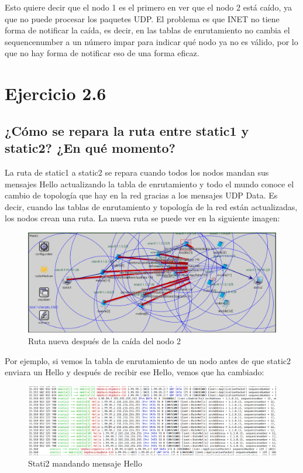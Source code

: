 Esto quiere decir que el nodo 1 es el primero en ver que el nodo 2 está caído, ya que no puede procesar los paquetes UDP. El problema es que INET no tiene forma de notificar la caída, es decir, en las tablas de enrutamiento no cambia el sequencenumber a un número impar para indicar qué nodo ya no es válido, por lo que no hay forma de notificar eso de una forma eficaz.



\section{Ejercicio 2.6}

\subsection{¿Cómo se repara la ruta entre static1 y static2? ¿En qué momento?}

La ruta de static1 a static2 se repara cuando todos los nodos mandan sus mensajes Hello actualizando la tabla de enrutamiento y todo el mundo conoce el cambio de topología que hay en la red gracias a los mensajes UDP Data. Es decir, cuando las tablas de enrutamiento y topología de la red están actualizadas, los nodos crean una ruta. La nueva ruta se puede ver en la siguiente imagen:

\begin{figure}[H]
    \centering
    \includegraphics[width=115mm, scale=0.75]{imaxes/dsdv/ejercicio2_6.png}
    \caption{Ruta nueva después de la caída del nodo 2}
    \label{fig:ejer2_6}
\end{figure}

Por ejemplo, si vemos la tabla de enrutamiento de un nodo antes de que static2 enviara un Hello y después de recibir ese Hello, vemos que ha cambiado:

\begin{figure}[H]
    \centering
    \includegraphics[width=145mm, scale=0.75]{imaxes/dsdv/ejercicio2_6_1.png}
    \caption{Stati2 mandando mensaje Hello}
    \label{fig:ejer2_6_1}
\end{figure}

